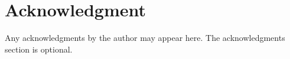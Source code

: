 \documentclass[letterpaper, preprint, paper,11pt]{AAS}	%
\begin{document}









\section{Acknowledgment}
Any acknowledgments by the author may appear here. The acknowledgments section is optional.


\end{document}

